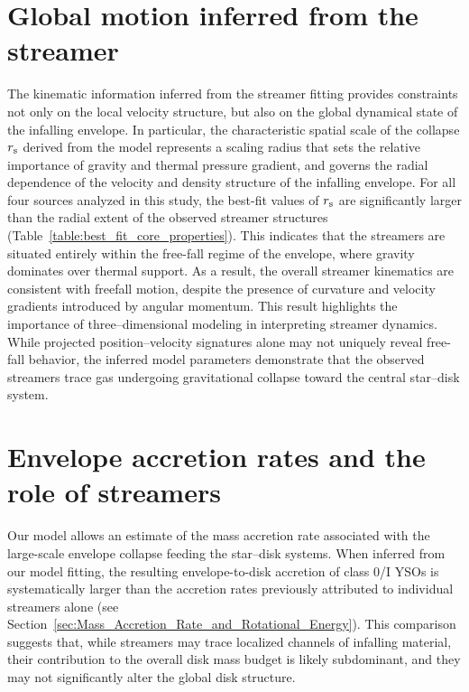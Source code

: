 \section{Global motion inferred from the streamer}
The kinematic information inferred from the streamer fitting provides constraints not only on the local velocity structure, but also on the global dynamical state of the infalling envelope. In particular, the characteristic spatial scale of the collapse $r_{\rm s}$ derived from the model represents a scaling radius that sets the relative importance of gravity and thermal pressure gradient, and governs the radial dependence of the velocity and density structure of the infalling envelope. For all four sources analyzed in this study, the best-fit values of $r_{\rm s}$ are significantly larger than the radial extent of the observed streamer structures (Table~\ref{table:best_fit_core_properties}). This indicates that the streamers are situated entirely within the free-fall regime of the envelope, where gravity dominates over thermal support. As a result, the overall streamer kinematics are consistent with freefall motion, despite the presence of curvature and velocity gradients introduced by angular momentum. This result highlights the importance of three--dimensional modeling in interpreting streamer dynamics. While projected position--velocity signatures alone may not uniquely reveal free-fall behavior, the inferred model parameters demonstrate that the observed streamers trace gas undergoing gravitational collapse toward the central star--disk system.

\section{Envelope accretion rates and the role of streamers}
Our model allows an estimate of the mass accretion rate associated with the large-scale envelope collapse feeding the star--disk systems. When inferred from our model fitting, the resulting envelope-to-disk accretion of class 0/I YSOs is systematically larger than the accretion rates previously attributed to individual streamers alone (see Section~\ref{sec:Mass_Accretion_Rate_and_Rotational_Energy}). This comparison suggests that, while streamers may trace localized channels of infalling material, their contribution to the overall disk mass budget is likely subdominant, and they may not significantly alter the global disk structure.


